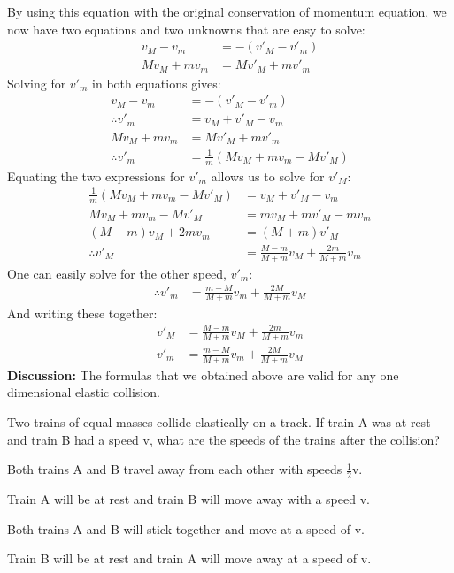 \begin{example}
By using this equation with the original conservation of momentum equation, we now have two equations and two unknowns that are easy to solve:
\begin{align*}
v_M-v_m &= - (v'_M-v'_m)\\
Mv_M+mv_m&=Mv'_M+mv'_m
\end{align*}
Solving for $v'_m$ in both equations gives:
\begin{align*}
v_M-v_m &= - (v'_M-v'_m)\\
\therefore v'_m &= v_M+v'_M-v_m\\
Mv_M+mv_m&=Mv'_M+mv'_m\\
\therefore v'_m&=\frac{1}{m}(Mv_M+mv_m-Mv'_M)
\end{align*}
Equating the two expressions for $v'_m$ allows us to solve for $v'_M$:
\begin{align*}
\frac{1}{m}(Mv_M+mv_m-Mv'_M)&=v_M+v'_M-v_m\\
Mv_M+mv_m-Mv'_M&=mv_M+mv'_M-mv_m\\
(M-m)v_M+2mv_m&=(M+m)v'_M\\
\therefore v'_M&=\frac{M-m}{M+m}v_M+\frac{2m}{M+m}v_m
\end{align*}
One can easily solve for the other speed, $v'_m$:
\begin{align*}
\therefore v'_m &= \frac{m-M}{M+m}v_m+\frac{2M}{M+m}v_M
\end{align*}
And writing these together:
\begin{align*}
v'_M&=\frac{M-m}{M+m}v_M+\frac{2m}{M+m}v_m\\
v'_m &= \frac{m-M}{M+m}v_m+\frac{2M}{M+m}v_M
\end{align*}
\textbf{Discussion:} The formulas that we obtained above are valid for any one dimensional elastic collision. 
\end{example}

\begin{checkpoint}
\begin{MCquestion}{Two trains of equal masses collide elastically on a track. If train A was at rest and train B had a speed v, what are the speeds of the trains after the collision?}
\item Both trains A and B travel away from each other with speeds $\frac{1}{2}$v.
\item Train A will be at rest and train B will move away with a speed v.
\item Both trains A and B will stick together and move at a speed of v.
\item Train B will be at rest and train A will move away at a speed of v. %
\end{MCquestion}
\end{checkpoint}

